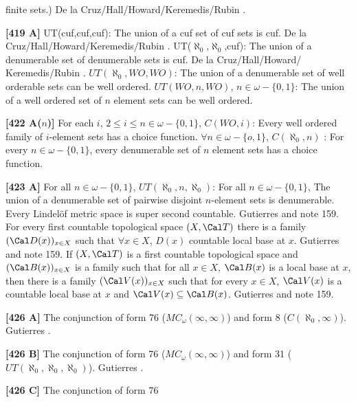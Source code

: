 finite sets.) \ac{De la Cruz/Hall/Howard/Keremedis/Rubin} \cite{2002a}.
\smallskip
\item{}{\bf [419 A]} UT(cuf,cuf,cuf): The union of a cuf set of cuf sets
is cuf. \ac{De la Cruz/Hall/Howard/Keremedis/Rubin} \cite{2002a}.
\medskip
{}  UT($\aleph_0$,$\aleph_0$,cuf): The union of a
denumerable set of denumerable sets is cuf. \ac{De la Cruz/Hall/Howard/
Keremedis/Rubin} \cite{2002a}.
\medskip
{}  $UT(\aleph_0,WO,WO)$: The union of a
denumerable set of well orderable sets can be well ordered.
\medskip
{} $UT(WO,n,WO)$, $n\in \omega-\{0,1\}$: The
union of a well ordered set of $n$ element sets can be well ordered.
\smallskip
\item{}{\bf [422 A($n$)]}  For each $i$, $2\leq i\leq n\in
\omega-\{0,1\}$, $C(WO,i)$: Every well ordered family of $i$-element sets has a choice
function.
\medskip
{} $\forall n\in \omega-\{o,1\}$, $C(\aleph_0, n)$ :
For every $n\in  \omega - \{0,1\}$, every denumerable set of $n$ element
sets has a choice function.
\smallskip
\item{}{\bf [423 A]}   For all $n\in\omega-\{0,1\}$,
$UT(\aleph_0,n,\aleph_0)$: For all $n\in\omega-\{0,1\}$, The union of a
denumerable set of pairwise disjoint $n$-element sets is denumerable.
\medskip
{} Every Lindel\"of metric space is super second
countable.  \ac{Gutierres} \cite{2004} and note 159. 
\medskip
{} For every first countable topological space $(X,
\Cal T)$ there is a family $(\Cal D(x))_{x \in X}$ such that $\forall x
\in X$, $D(x)$ countable local base at $x$.  \ac{Gutierres} \cite{2004}
and note 159.
\medskip
{}  If $(X,\Cal T) $ is a first countable
topological space and $(\Cal B(x))_{x\in X}$ is a family such that for all
$x \in X$, $\Cal B(x)$ is a local base at $x$, then there is a family $(
\Cal V(x))_{x\in X}$ such that for every $x \in X$, $\Cal V(x)$ is a
countable local base at $x$ and $\Cal V(x) \subseteq \Cal B(x)$.
\ac{Gutierres} \cite{2004} and note 159.
\smallskip
\item{}{\bf [426 A]} The conjunction of form 76
($MC_\omega(\infty,\infty)$) and form 8 ($C(\aleph_0,\infty)$).
\ac{Gutierres} \cite{2004}.
\smallskip
\item{}{\bf [426 B]} The conjunction of form 76
($MC_\omega(\infty, \infty)$) and form 31
($UT(\aleph_0,\aleph_0,\aleph_0)$). \ac{Gutierres} \cite{2004}.
\smallskip
\item{}{\bf [426 C]} The conjunction of form 76

